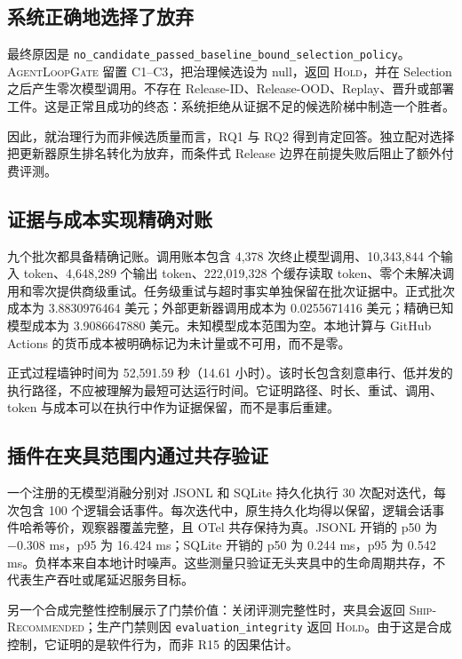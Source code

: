 \documentclass[UTF8,10pt,twocolumn,fontset=none]{ctexart}
\newcommand{\system}{\textsc{AgentLoopGate}\xspace}
\newcommand{\hold}{\textsc{Hold}\xspace}
\newcommand{\ship}{\textsc{Ship-Recommended}\xspace}
\newcommand{\code}[1]{\texttt{#1}}
\begin{document}
\subsection{系统正确地选择了放弃}

最终原因是 \nolinkurl{no_candidate_passed_baseline_bound_selection_policy}。\system 留置 C1--C3，把治理候选设为 null，返回 \hold，并在 Selection 之后产生零次模型调用。不存在 Release-ID、Release-OOD、Replay、晋升或部署工件。这是正常且成功的终态：系统拒绝从证据不足的候选阶梯中制造一个胜者。

因此，就治理行为而非候选质量而言，RQ1 与 RQ2 得到肯定回答。独立配对选择把更新器原生排名转化为放弃，而条件式 Release 边界在前提失败后阻止了额外付费评测。

\subsection{证据与成本实现精确对账}

九个批次都具备精确记账。调用账本包含 4,378 次终止模型调用、10,343,844 个输入 token、4,648,289 个输出 token、222,019,328 个缓存读取 token、零个未解决调用和零次提供商级重试。任务级重试与超时事实单独保留在批次证据中。正式批次成本为 3.8830976464 美元；外部更新器调用成本为 0.0255671416 美元；精确已知模型成本为 3.9086647880 美元。未知模型成本范围为空。本地计算与 GitHub Actions 的货币成本被明确标记为未计量或不可用，而不是零。

正式过程墙钟时间为 52,591.59 秒（14.61 小时）。该时长包含刻意串行、低并发的执行路径，不应被理解为最短可达运行时间。它证明路径、时长、重试、调用、token 与成本可以在执行中作为证据保留，而不是事后重建。

\subsection{插件在夹具范围内通过共存验证}

一个注册的无模型消融分别对 JSONL 和 SQLite 持久化执行 30 次配对迭代，每次包含 100 个逻辑会话事件。每次迭代中，原生持久化均得以保留，逻辑会话事件哈希等价，观察器覆盖完整，且 OTel 共存保持为真。JSONL 开销的 p50 为 $-0.308$ ms，p95 为 16.424 ms；SQLite 开销的 p50 为 0.244 ms，p95 为 0.542 ms。负样本来自本地计时噪声。这些测量只验证无头夹具中的生命周期共存，不代表生产吞吐或尾延迟服务目标。

另一个合成完整性控制展示了门禁价值：关闭评测完整性时，夹具会返回 \ship；生产门禁则因 \code{evaluation\_integrity} 返回 \hold。由于这是合成控制，它证明的是软件行为，而非 R15 的因果估计。
\end{document}
